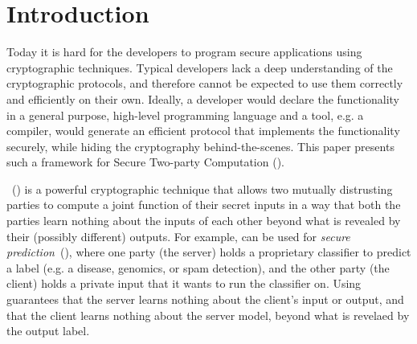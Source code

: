   
  

\section{Introduction}
\label{sec:intro}

Today it is hard for the developers to program secure applications
using cryptographic techniques. Typical developers lack a deep
understanding of the cryptographic protocols, and therefore cannot be
expected to use them correctly and efficiently on their own.
Ideally, a developer would declare the functionality in a general
purpose, high-level programming language and a
tool, e.g. a compiler, would generate an efficient protocol that
implements the functionality securely, while hiding the cryptography
behind-the-scenes. This paper presents such a framework for Secure
Two-party Computation (\mpc).



\mpc~(\cite{yao,gmw}) is a powerful
cryptographic technique that allows two mutually distrusting parties
to compute a joint function of their secret inputs in a way that both
the parties learn nothing about the inputs of each other beyond what
is revealed by their (possibly different) outputs. For example, \mpc
can be used for {\em secure
prediction}~(\cite{shafindss,wu,barni,minionn,secureml}),
where one party (the server) holds a proprietary classifier to predict
a label (e.g. a disease, genomics, or spam detection), and the other
party (the client) holds a private input that it wants to run the
classifier on. Using \mpc guarantees that the server learns nothing
about the client's input or output, and that the client learns nothing
about the server model, beyond what is revelaed by the output
label.


